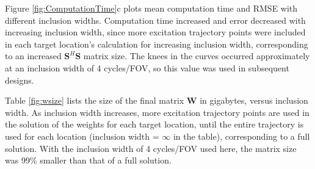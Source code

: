 \par Figure \ref{fig:ComputationTime}c plots mean computation time and RMSE with different inclusion widths. 
Computation time increased and error decreased with increasing inclusion width,
since more excitation trajectory points were included in each target location's calculation for increasing inclusion width,
corresponding to an increased $\bm{S}^H\bm{S}$ matrix size. 
The knees in the curves occurred approximately at an inclusion width of 4 cycles/FOV,
so this value was used in subsequent designs. 

\par Table \ref{fig:wsize} lists the size of the final matrix $\bm{W}$ in gigabytes,
versus inclusion width.
As inclusion width increases, more excitation trajectory points are used in the solution of the weights for each target location,
until the entire trajectory is used for each location (inclusion width = $\infty$ in the table),
corresponding to a full solution. 
With the inclusion width of 4 cycles/FOV used here, 
the matrix size was 99\% smaller than that of a full solution.  





